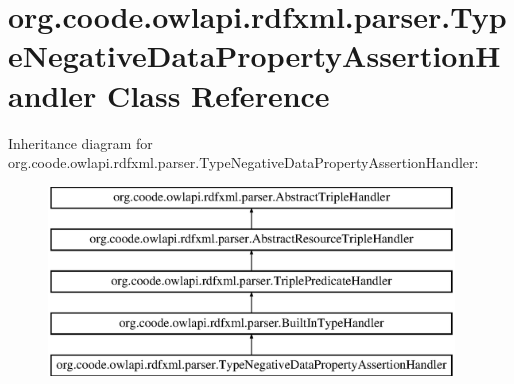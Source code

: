 \hypertarget{classorg_1_1coode_1_1owlapi_1_1rdfxml_1_1parser_1_1_type_negative_data_property_assertion_handler}{\section{org.\-coode.\-owlapi.\-rdfxml.\-parser.\-Type\-Negative\-Data\-Property\-Assertion\-Handler Class Reference}
\label{classorg_1_1coode_1_1owlapi_1_1rdfxml_1_1parser_1_1_type_negative_data_property_assertion_handler}
}
Inheritance diagram for org.\-coode.\-owlapi.\-rdfxml.\-parser.\-Type\-Negative\-Data\-Property\-Assertion\-Handler\-:\begin{figure}[H]
\begin{center}
\leavevmode
\includegraphics[height=5.000000cm]{classorg_1_1coode_1_1owlapi_1_1rdfxml_1_1parser_1_1_type_negative_data_property_assertion_handler}
\end{center}
\end{figure}
